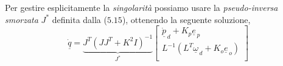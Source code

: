 Per gestire esplicitamente la \emph{singolarità} possiamo usare la \emph{pseudo-inversa smorzata} $J^*$ definita dalla ($5.15$), ottenendo la seguente soluzione,
\begin{equation}
	\underline{\dot{q}} = \underbrace{J^T(JJ^T + K^2I)^{-1}}_{J^*}  
	\begin{bmatrix}
		\underline{\dot{p}}_{\,d} + K_p \underline{e}_{\,p} \\
		L^{-1}(L^T \underline{\omega}_{\,d} + K_o \underline{e}_{\,o}) \\
	\end{bmatrix}
\end{equation}